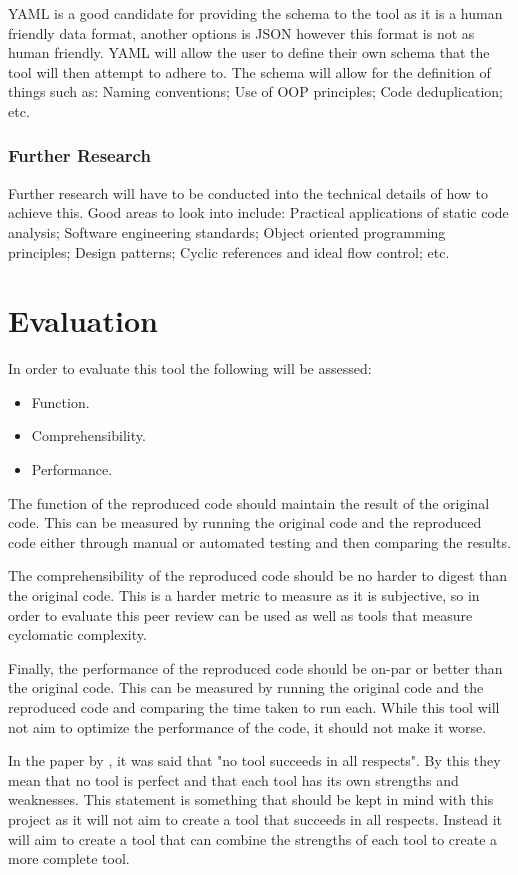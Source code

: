 \documentclass{article} %
\begin{document}
YAML is a good candidate for providing the schema to the tool as it is a human friendly data format, another options is JSON however this format is not as human friendly. YAML will allow the user to define their own schema that the tool will then attempt to adhere to. The schema will allow for the definition of things such as: Naming conventions; Use of OOP principles; Code deduplication; etc.

\subsubsection{Further Research}
Further research will have to be conducted into the technical details of how to achieve this. Good areas to look into include: Practical applications of static code analysis; Software engineering standards; Object oriented programming principles; Design patterns; Cyclic references and ideal flow control; etc.

\section{Evaluation}

In order to evaluate this tool the following will be assessed:
\begin{itemize}
	\item Function.
	\item Comprehensibility.
	\item Performance.
\end{itemize}
The function of the reproduced code should maintain the result of the original code. This can be measured by running the original code and the reproduced code either through manual or automated testing and then comparing the results.

The comprehensibility of the reproduced code should be no harder to digest than the original code. This is a harder metric to measure as it is subjective, so in order to evaluate this peer review can be used as well as tools that measure cyclomatic complexity.

Finally, the performance of the reproduced code should be on-par or better than the original code. This can be measured by running the original code and the reproduced code and comparing the time taken to run each. While this tool will not aim to optimize the performance of the code, it should not make it worse.

In the paper by \cite{8681007}, it was said that "no tool succeeds in all respects". By this they mean that no tool is perfect and that each tool has its own strengths and weaknesses. This statement is something that should be kept in mind with this project as it will not aim to create a tool that succeeds in all respects. Instead it will aim to create a tool that can combine the strengths of each tool to create a more complete tool.


\end{document}
